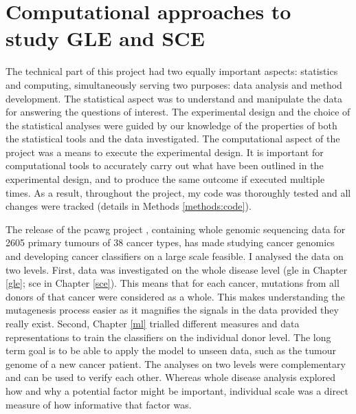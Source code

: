 


\section{Computational approaches to study GLE and SCE}
\label{intro:ml}

The technical part of this project had two equally important aspects: statistics and computing, simultaneously serving two purposes: data analysis and method development. The statistical aspect was to understand and manipulate the data for answering the questions of interest. The experimental design and the choice of the statistical analyses were guided by our knowledge of the properties of both the statistical tools and the data investigated. The computational aspect of the project was a means to execute the experimental design. It is important for computational tools to accurately carry out what have been outlined in the experimental design, and to produce the same outcome if executed multiple times. As a result, throughout the project, my code was thoroughly tested and all changes were tracked (details in Methods \ref{methods:code}). 

The release of the \gls{pcawg} project \citep{Campbell2020}, containing whole genomic sequencing data for 2605 primary tumours of 38 cancer types, has made studying cancer genomics and developing cancer classifiers on a large scale feasible. I analysed the data on two levels. First, data was investigated on the whole disease level (\gls{gle} in Chapter \ref{gle}; \gls{sce} in Chapter \ref{sce}). This means that for each cancer, mutations from all donors of that cancer were considered as a whole. This makes understanding the mutagenesis process easier as it magnifies the signals in the data provided they really exist. Second, Chapter \ref{ml} trialled different measures and data representations to train the classifiers on the individual donor level. The long term goal is to be able to apply the model to unseen data, such as the tumour genome of a new cancer patient. The analyses on two levels were complementary and can be used to verify each other. Whereas whole disease analysis explored how and why a potential factor might be important, individual scale was a direct measure of how informative that factor was.  

